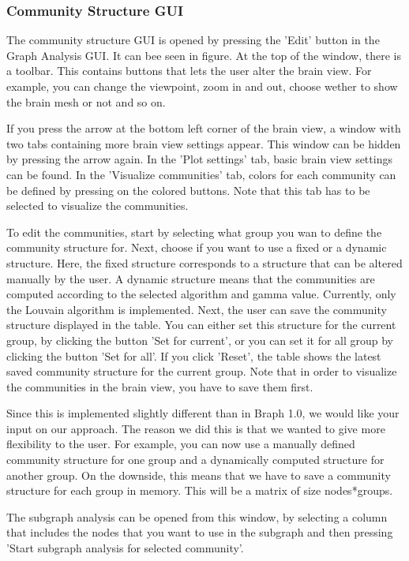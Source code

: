 \documentclass{article}
\begin{document}
\subsubsection{Community Structure GUI}

The community structure GUI is opened by pressing the 'Edit' button in the Graph Analysis GUI. It can bee seen in figure. At the top of the window, there is a toolbar. This contains buttons that lets the user alter the brain view. For example, you can change the viewpoint, zoom in and out, choose wether to show the brain mesh or not and so on.

If you press the arrow at the bottom left corner of the brain view, a window with two tabs containing more brain view settings appear. This window can be hidden by pressing the arrow again. In the 'Plot settings' tab, basic brain view settings can be found. In the 'Visualize communities' tab, colors for each community can be defined by pressing on the colored buttons. Note that this tab has to be selected to visualize the communities. 

To edit the communities, start by selecting what group you wan to define the community structure for. Next, choose if you want to use a fixed or a dynamic structure. Here, the fixed structure corresponds to a structure that can be altered manually by the user. A dynamic structure means that the communities are computed according to the selected algorithm and gamma value. Currently, only the Louvain algorithm is implemented. Next, the user can save the community structure displayed in the table. You can either set this structure for the current group, by clicking the button 'Set for current', or you can set it for all group by clicking the button 'Set for all'. If you click 'Reset', the table shows the latest saved community structure for the current group. Note that in order to visualize the communities in the brain view, you have to save them first.

Since this is implemented slightly different than in Braph 1.0, we would like your input on our approach. The reason we did this is that we wanted to give more flexibility to the user. For example, you can now use a manually defined community structure for one group and a dynamically computed structure for another group. On the downside, this means that we have to save a community structure for each group in memory. This will be a matrix of size nodes*groups.

The subgraph analysis can be opened from this window, by selecting a column that includes the nodes that you want to use in the subgraph and then pressing 'Start subgraph analysis for selected community'.
\end{document}
